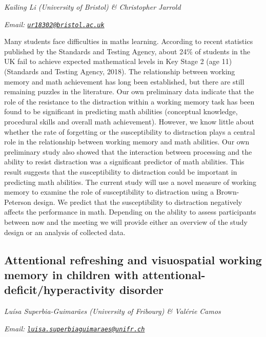 \documentclass[12pt,]{book}
\begin{document}
\emph{Kailing Li (University of Bristol) \& Christopher Jarrold}

\emph{Email: \href{mailto:ur18302@bristol.ac.uk}{\nolinkurl{ur18302@bristol.ac.uk}}}

Many students face difficulties in maths learning. According to recent statistics published by the Standards and Testing Agency, about 24\% of students in the UK fail to achieve expected mathematical levels in Key Stage 2 (age 11) (Standards and Testing Agency, 2018). The relationship between working memory and math achievement has long been established, but there are still remaining puzzles in the literature. Our own preliminary data indicate that the role of the resistance to the distraction within a working memory task has been found to be significant in predicting math abilities (conceptual knowledge, procedural skills and overall math achievement). However, we know little about whether the rate of forgetting or the susceptibility to distraction plays a central role in the relationship between working memory and math abilities. Our own preliminary study also showed that the interaction between processing and the ability to resist distraction was a significant predictor of math abilities. This result suggests that the susceptibility to distraction could be important in predicting math abilities. The current study will use a novel measure of working memory to examine the role of susceptibility to distraction using a Brown-Peterson design. We predict that the susceptibility to distraction negatively affects the performance in math. Depending on the ability to assess participants between now and the meeting we will provide either an overview of the study design or an analysis of collected data.

\hypertarget{attentional-refreshing-and-visuospatial-working-memory-in-children-with-attentional-deficithyperactivity-disorder}{%
\subsection{Attentional refreshing and visuospatial working memory in children with attentional-deficit/hyperactivity disorder}\label{attentional-refreshing-and-visuospatial-working-memory-in-children-with-attentional-deficithyperactivity-disorder}}

\emph{Luísa Superbia-Guimarães (University of Fribourg) \& Valérie Camos}

\emph{Email: \href{mailto:luisa.superbiaguimaraes@unifr.ch}{\nolinkurl{luisa.superbiaguimaraes@unifr.ch}}}
\end{document}
